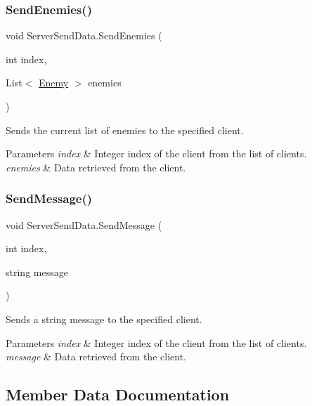\subsubsection{\texorpdfstring{SendEnemies()}{SendEnemies()}}
{\footnotesize\ttfamily void Server\+Send\+Data.\+Send\+Enemies (\begin{DoxyParamCaption}\item[{int}]{index,  }\item[{List$<$ \mbox{\hyperlink{class_enemy}{Enemy}} $>$}]{enemies }\end{DoxyParamCaption})}



Sends the current list of enemies to the specified client. 


\begin{DoxyParams}{Parameters}
{\em index} & Integer index of the client from the list of clients.\\
\hline
{\em enemies} & Data retrieved from the client.\\
\hline
\end{DoxyParams}
\mbox{\label{class_server_send_data_a360f11f9f0c66245d98ee14a6da70218}} 
\subsubsection{\texorpdfstring{SendMessage()}{SendMessage()}}
{\footnotesize\ttfamily void Server\+Send\+Data.\+Send\+Message (\begin{DoxyParamCaption}\item[{int}]{index,  }\item[{string}]{message }\end{DoxyParamCaption})}



Sends a string message to the specified client. 


\begin{DoxyParams}{Parameters}
{\em index} & Integer index of the client from the list of clients.\\
\hline
{\em message} & Data retrieved from the client.\\
\hline
\end{DoxyParams}


\subsection{Member Data Documentation}
\mbox{\label{class_server_send_data_a6857a6a98dddeec22456fe8a362c7c30}} 
